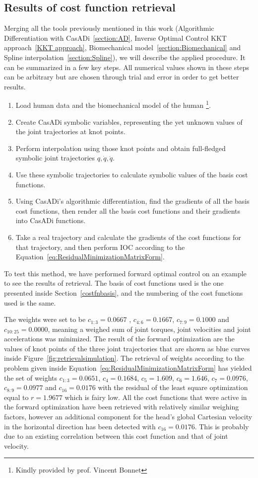 \documentclass[12pt, a4paper]{article}
\begin{document}
\newpage
\subsection{Results of cost function retrieval} \label{results}
Merging all the tools previously mentioned in this work (Algorithmic Differentiation with CasADi~\ref{section:AD}, Inverse Optimal Control KKT approach~\ref{KKT approach}, Biomechanical model~\ref{section:Biomechanical} and Spline interpolation~\ref{section:Spline}), we will describe the applied procedure. It can be summarized in a few key steps. All numerical values shown in these steps can be arbitrary but are chosen through trial and error in order to get better results.
\begin{enumerate}
    \item Load human data and the biomechanical model of the human \footnote{Kindly provided by prof. Vincent Bonnet}.
    \item Create CasADi symbolic variables, representing the yet unknown values of the joint trajectories at knot points.
    \item Perform interpolation using those knot points and obtain full-fledged symbolic joint trajectories $q, \dot{q}, \ddot{q}$.
    \item Use these symbolic trajectories to calculate symbolic values of the basis cost functions.
    \item Using CasADi's algorithmic differentiation, find the gradients of all the basis cost functions, then render all the basis cost functions and their gradients into CasADi functions.
    \item Take a real trajectory and calculate the gradients of the cost functions for that trajectory, and then perform IOC according to the Equation~\eqref{eq:ResidualMinimizationMatrixForm}.
\end{enumerate}
To test this method, we have performed forward optimal control on an example to see the results of retrieval. The basis of cost functions used is the one presented inside Section~\ref{costfnbasis}, and the numbering of the cost functions used is the same.\par
The weights were set to be $c_{1:3} = 0.0667$ , $c_{4:6} = 0.1667$, $c_{7:9} = 0.1000$ and $c_{10:25} = 0.0000$, meaning a weighed sum of joint torques, joint velocities and joint accelerations was minimized.
The result of the forward optimization are the values of knot points of the three joint trajectories that are shown as blue curves inside Figure~\eqref{fig:retrievalsimulation}. The retrieval of weights according to the problem given inside Equation~\ref{eq:ResidualMinimizationMatrixForm} has yielded the set of weights $c_{1:3} = 0.0651$, $c_4 = 0.1684$, $c_5 = 1.609$, $c_6=1.646$, $c_7=0.0976$, $c_{8:9}=0.0977$ and $c_{16}=0.0176$  with the residual of the least square optimization equal to $r  = 1.9677 $ which is fairy low. All the cost functions that were active in the forward optimization have been retrieved with relatively similar weighing factors, however an additional component for the head's global Cartesian velocity in the horizontal direction has been detected with $c_{16}=0.0176$. This is probably due to an existing correlation between this cost function and that of joint velocity.\par
\end{document}
